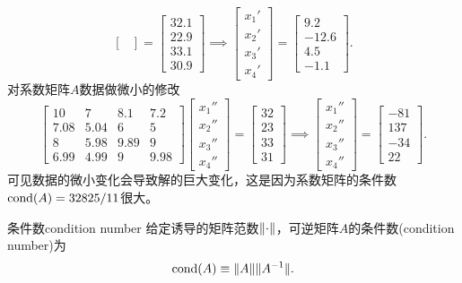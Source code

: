 \begin{example}
\[\begin{bmatrix}
        \end{bmatrix} = \begin{bmatrix}
            32.1\\22.9\\33.1\\30.9
        \end{bmatrix} \implies \begin{bmatrix}
            x_1'\\x_2'\\x_3'\\x_4'
        \end{bmatrix} = \begin{bmatrix}
            9.2\\-12.6\\4.5\\-1.1
        \end{bmatrix}.
    \]
    对系数矩阵$A$数据做微小的修改
    \[
        \begin{bmatrix}
            10&7&8.1&7.2\\
            7.08&5.04&6&5\\
            8&5.98&9.89&9\\
            6.99&4.99&9&9.98
        \end{bmatrix}\begin{bmatrix}
            x_1''\\x_2''\\x_3''\\x_4''
        \end{bmatrix} = \begin{bmatrix}
            32\\23\\33\\31
        \end{bmatrix} \implies \begin{bmatrix}
            x_1''\\x_2''\\x_3''\\x_4''
        \end{bmatrix} = \begin{bmatrix}
            -81\\137\\-34\\22
        \end{bmatrix}.
    \]
    可见数据的微小变化会导致解的巨大变化，这是因为系数矩阵的条件数$\operatorname{cond}(A) = 32825/11$很大。
\end{example}

\begin{definition}
    {条件数}{condition number}
    给定诱导的矩阵范数$\lVert\cdot\rVert$，可逆矩阵$A$的条件数(condition number)为
    \begin{equation}
        \operatorname{cond}(A) \equiv \lVert A\rVert\lVert A^{-1}\rVert.
    \end{equation}
\end{definition}


